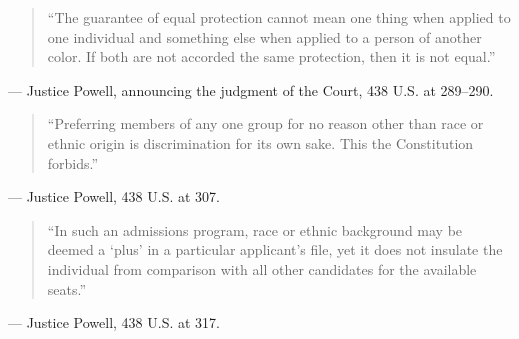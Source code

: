 \documentclass[12pt]{article}
\begin{document}
\begin{quote}
``The guarantee of equal protection cannot mean one thing when applied to one individual and something else when applied to a person of another color. If both are not accorded the same protection, then it is not equal.''
\end{quote}
\noindent --- Justice Powell, announcing the judgment of the Court, 438 U.S. at 289--290.

\begin{quote}
``Preferring members of any one group for no reason other than race or ethnic origin is discrimination for its own sake. This the Constitution forbids.''
\end{quote}
\noindent --- Justice Powell, 438 U.S. at 307.

\begin{quote}
``In such an admissions program, race or ethnic background may be deemed a `plus' in a particular applicant's file, yet it does not insulate the individual from comparison with all other candidates for the available seats.''
\end{quote}
\noindent --- Justice Powell, 438 U.S. at 317.
\end{document}
